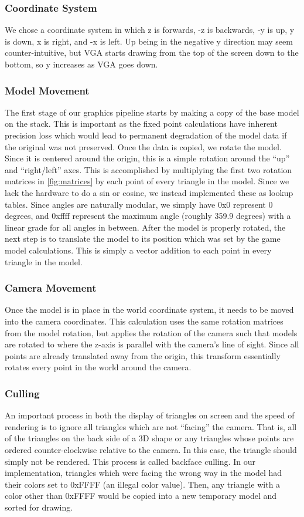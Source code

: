 \documentclass[onecolumn]{IEEEtran}
\begin{document}
\subsubsection{Coordinate System}
We chose a coordinate system in which z is forwards, -z is backwards, -y is up, y is down, x is right, and -x is left.  Up being in the negative y direction may seem counter-intuitive, but VGA starts drawing from the top of the screen down to the bottom, so y increases as VGA goes down.

\subsubsection{Model Movement}
The first stage of our graphics pipeline starts by making a copy of the base model on the stack.  This is important as the fixed point calculations have inherent precision loss which would lead to permanent degradation of the model data if the original was not preserved.  Once the data is copied, we rotate the model.  Since it is centered around the origin, this is a simple rotation around the “up” and “right/left” axes.  This is accomplished by multiplying the first two rotation matrices in \ref{fig:matrices} by each point of every triangle in the model.  Since we lack the hardware to do a sin or cosine, we instead implemented these as lookup tables.  Since angles are naturally modular, we simply have 0x0 represent 0 degrees, and 0xffff represent the maximum angle (roughly 359.9 degrees) with a linear grade for all angles in between.  After the model is properly rotated, the next step is to translate the model to its position which was set by the game model calculations.  This is simply a vector addition to each point in every triangle in the model.

\subsubsection{Camera Movement}
Once the model is in place in the world coordinate system, it needs to be moved into the camera coordinates.  This calculation uses the same rotation matrices from the model rotation, but applies the rotation of the camera such that models are rotated to where the z-axis is parallel with the camera’s line of sight.  Since all points are already translated away from the origin, this transform essentially rotates every point in the world around the camera.

\subsubsection{Culling}
An important process in both the display of triangles on screen and the speed of rendering is to ignore all triangles which are not “facing” the camera.  That is, all of the triangles on the back side of a 3D shape or any triangles whose points are ordered counter-clockwise relative to the camera.  In this case, the triangle should simply not be rendered.  This process is called backface culling.  In our implementation, triangles which were facing the wrong way in the model had their colors set to 0xFFFF (an illegal color value).  Then, any triangle with a color other than 0xFFFF would be copied into a new temporary model and sorted for drawing.
\end{document}
